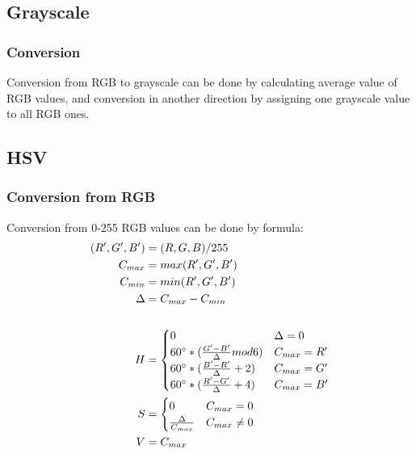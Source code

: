 \documentclass[titlepage]{article}
\begin{document}
\subsection{Grayscale}
\subsubsection{Conversion}
Conversion from RGB to grayscale can be done by calculating average value of RGB
values, and conversion in another direction by assigning one grayscale value to
all RGB ones.

\subsection{HSV}
\subsubsection{Conversion from RGB}
Conversion from 0-255 RGB values can be done by formula:
\begin{equation}
\begin{split}
(R', G', B')&=(R, G, B)/255\\
C_{max}&=max(R', G', B')\\
C_{min}&=min(R', G', B')\\
\Delta&=C_{max}-C_{min}\\
\\
H&=\begin{cases}
0 & \Delta=0 \\
60\degree*(\frac{G'-B'}{\Delta}mod6) & C_{max}=R' \\
60\degree*(\frac{B'-R'}{\Delta}+2) & C_{max}=G' \\
60\degree*(\frac{R'-G'}{\Delta}+4) & C_{max}=B'
\end{cases} \\
S&=\begin{cases}
0 & C_{max}=0 \\
\frac{\Delta}{C_{max}} & C_{max} \neq 0
\end{cases}\\
V&=C_{max}
\end{split}
\end{equation}
\end{document}
